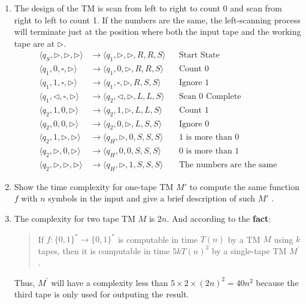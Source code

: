 \documentclass[12pt,a4paper]{article}
\makeatletter
\newtheorem*{solution}{Solution}
\theoremstyle{definition}
\renewenvironment{solution}[1][Solution] {\par\pushQED{\qed}\normalfont\topsep6\p@\@plus6\p@\relax\trivlist\item[\hskip\labelsep\bfseries#1\@addpunct{.}]\ignorespaces}{\popQED\endtrivlist\@endpefalse} \makeatother
\makeatother
\begin{document}
\begin{enumerate}
\begin{enumerate}
	\begin{solution}
		The design of the TM is scan from left to right to count 0 and scan from right to left to count 1. If the numbers are the same, the left-scanning process will terminate just at the position where both the input tape and the working tape are at $\triangleright$.
		\begin{align*}
			\langle q_S, \triangleright, \triangleright, \triangleright \rangle &\rightarrow \langle q_1, \triangleright,\triangleright,  R, R, S \rangle &&\text{Start State}\\
			\langle q_1, 0, \square, \triangleright \rangle &\rightarrow \langle q_1, 0, \triangleright, R, R, S\rangle&&\text{Count 0}\\
			\langle q_1, 1, \square, \triangleright \rangle &\rightarrow \langle q_1, \square, \triangleright, R, S, S\rangle&&\text{Ignore 1}\\
			\langle q_1, \triangleleft, \square, \triangleright\rangle &\rightarrow \langle q_2, \triangleleft, \triangleright, L, L, S\rangle&&\text{Scan 0 Complete}\\
			\langle q_2, 1, 0, \triangleright \rangle &\rightarrow \langle q_2, 1, \triangleright, L, L, S\rangle&&\text{Count 1}\\
			\langle q_2, 0, 0, \triangleright \rangle &\rightarrow \langle q_2, 0, \triangleright, L, S, S\rangle&&\text{Ignore 0}\\
			\langle q_2, 1, \triangleright, \triangleright \rangle &\rightarrow \langle q_H,\triangleright, 0, S, S, S\rangle&&\text{1 is more than 0}\\
			\langle q_2, \triangleright, 0, \triangleright\rangle &\rightarrow \langle q_H, 0, 0, S, S, S\rangle&&\text{0 is more than 1}\\
			\langle q_2, \triangleright, \triangleright, \triangleright \rangle &\rightarrow \langle q_H, \triangleright, 1, S, S, S\rangle&&\text{The numbers are the same}
		\end{align*}
	\end{solution}

	\item 
	Show the time complexity for one-tape TM $M'$ to compute the same function $f$ with $n$ symbols in the input and give a brief description of such $M'$ .

	\begin{solution}
		The complexity for two tape TM $M$ is $2n$. And according to the \textbf{fact}:
		\begin{quotation}
			If $f:\{0,1\}^*\rightarrow \{0,1\}^*$ is computable in time $T(n)$ by a TM $M$ using $k$ tapes, then it is computable in time $5kT(n)^2$ by a single-tape
			TM $M^\prime$.
		\end{quotation}
		Thus, $M^\prime$ will have a complexity less than $5\times 2\times (2n)^2 = 40n^2$ because the third tape is only used for outputing the result.


\end{solution}
\end{enumerate}
\end{enumerate}
\end{document}
